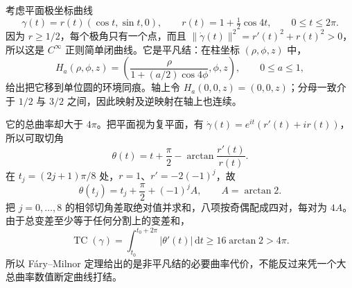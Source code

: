 \begin{example}\label{g1:exm:unknot-large-curvature}
	考虑平面极坐标曲线
	\[
		\gamma(t)=r(t)(\cos t,\sin t,0),\qquad
		r(t)=1+\tfrac12\cos4t,\qquad 0\le t\le2\pi.
	\]
	因为 \(r\ge1/2\)，每个极角只有一个点，而且 \(\|\dot\gamma(t)\|^2=r'(t)^2+r(t)^2>0\)，所以这是 \(C^\infty\) 正则简单闭曲线。它是平凡结：在柱坐标 \((\rho,\phi,z)\) 中，
	\[
		H_a(\rho,\phi,z)=
		\left(\frac{\rho}{1+(a/2)\cos4\phi},\phi,z\right),
		\qquad 0\le a\le1,
	\]
	给出把它移到单位圆的环境同痕。轴上令 \(H_a(0,0,z)=(0,0,z)\)；分母一致介于 \(1/2\) 与 \(3/2\) 之间，因此映射及逆映射在轴上也连续。

	它的总曲率却大于 \(4\pi\)。把平面视为复平面，有 \(\dot\gamma(t)=e^{it}(r'(t)+ir(t))\)，所以可取切角
	\[
		\theta(t)=t+\frac\pi2-\arctan\frac{r'(t)}{r(t)}.
	\]
	在 \(t_j=(2j+1)\pi/8\) 处，\(r=1\)、\(r'=-2(-1)^j\)，故
	\[
		\theta(t_j)=t_j+\frac\pi2+(-1)^j A,\qquad A=\arctan2.
	\]
	把 \(j=0,\ldots,8\) 的相邻切角差取绝对值并求和，八项按奇偶配成四对，每对为 \(4A\)。由于总变差至少等于任何分割上的变差和，
	\[
		\operatorname{TC}(\gamma)=\int_{t_0}^{t_0+2\pi}|\theta'(t)|\,\mathrm{d}t
		\ge16\arctan2>4\pi.
	\]
	所以 Fáry--Milnor 定理给出的是非平凡结的必要曲率代价，不能反过来凭一个大总曲率数值断定曲线打结。
\end{example}
